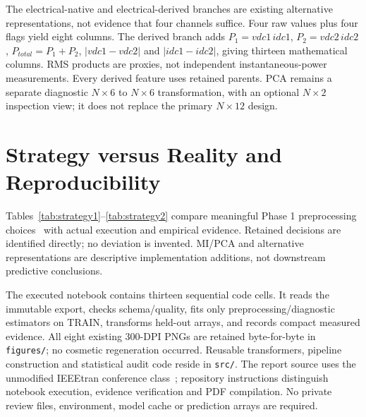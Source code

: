 \documentclass[conference]{IEEEtran}
\begin{document}
The electrical-native and electrical-derived branches are existing alternative representations, not evidence that four channels suffice. Four raw values plus four flags yield eight columns. The derived branch adds $P_1=vdc1\,idc1$, $P_2=vdc2\,idc2$, $P_{total}=P_1+P_2$, $|vdc1-vdc2|$ and $|idc1-idc2|$, giving thirteen mathematical columns. RMS products are proxies, not independent instantaneous-power measurements. Every derived feature uses retained parents. PCA remains a separate diagnostic $N\times6$ to $N\times6$ transformation, with an optional $N\times2$ inspection view; it does not replace the primary $N\times12$ design.

\section{Strategy versus Reality and Reproducibility}
Tables~\ref{tab:strategy1}--\ref{tab:strategy2} compare meaningful Phase 1 preprocessing choices~\cite{phase1} with actual execution and empirical evidence. Retained decisions are identified directly; no deviation is invented. MI/PCA and alternative representations are descriptive implementation additions, not downstream predictive conclusions.

The executed notebook contains thirteen sequential code cells. It reads the immutable export, checks schema/quality, fits only preprocessing/diagnostic estimators on TRAIN, transforms held-out arrays, and records compact measured evidence. All eight existing 300-DPI PNGs are retained byte-for-byte in \texttt{figures/}; no cosmetic regeneration occurred. Reusable transformers, pipeline construction and statistical audit code reside in \texttt{src/}. The report source uses the unmodified IEEEtran conference class~\cite{ieee}; repository instructions distinguish notebook execution, evidence verification and PDF compilation. No private review files, environment, model cache or prediction arrays are required.
\end{document}
